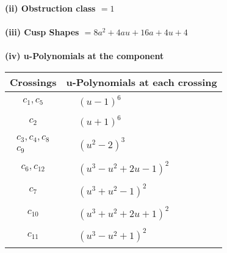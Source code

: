 \documentclass[1p]{elsarticle_modified}
\theoremstyle{definition}
\begin{document}
\flushleft \textbf{(ii) Obstruction class $= 1$}\\~\\
\flushleft \textbf{(iii) Cusp Shapes $= 8 a^2+4 a u+16 a+4 u+4$}\\~\\
\newpage\renewcommand{\arraystretch}{1}
\flushleft \textbf{(iv) u-Polynomials at the component}\newline \\
\begin{tabular}{m{50pt}|m{274pt}}
Crossings & \hspace{64pt}u-Polynomials at each crossing \\
\hline $$\begin{aligned}c_{1},c_{5}\end{aligned}$$&$\begin{aligned}
&(u-1)^6
\end{aligned}$\\
\hline $$\begin{aligned}c_{2}\end{aligned}$$&$\begin{aligned}
&(u+1)^6
\end{aligned}$\\
\hline $$\begin{aligned}c_{3},c_{4},c_{8}\\c_{9}\end{aligned}$$&$\begin{aligned}
&(u^2-2)^3
\end{aligned}$\\
\hline $$\begin{aligned}c_{6},c_{12}\end{aligned}$$&$\begin{aligned}
&(u^3- u^2+2 u-1)^2
\end{aligned}$\\
\hline $$\begin{aligned}c_{7}\end{aligned}$$&$\begin{aligned}
&(u^3+u^2-1)^2
\end{aligned}$\\
\hline $$\begin{aligned}c_{10}\end{aligned}$$&$\begin{aligned}
&(u^3+u^2+2 u+1)^2
\end{aligned}$\\
\hline $$\begin{aligned}c_{11}\end{aligned}$$&$\begin{aligned}
&(u^3- u^2+1)^2
\end{aligned}$\\
\hline
\end{tabular}\\~\\
\end{document}
